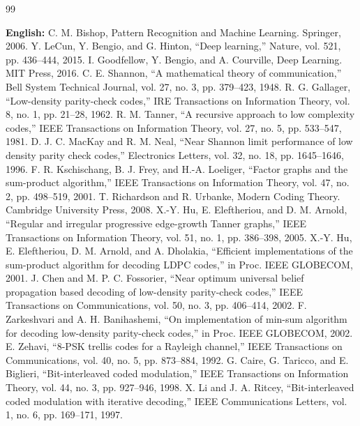\begin{thebibliography}{99}
\item[]\textbf{English:}
 C. M. Bishop, Pattern Recognition and Machine Learning. Springer, 2006.
 Y. LeCun, Y. Bengio, and G. Hinton, ``Deep learning,'' Nature, vol. 521, pp. 436--444, 2015.
 I. Goodfellow, Y. Bengio, and A. Courville, Deep Learning. MIT Press, 2016.
 C. E. Shannon, ``A mathematical theory of communication,'' Bell System Technical Journal, vol. 27, no. 3, pp. 379--423, 1948.
 R. G. Gallager, ``Low-density parity-check codes,'' IRE Transactions on Information Theory, vol. 8, no. 1, pp. 21--28, 1962.
 R. M. Tanner, ``A recursive approach to low complexity codes,'' IEEE Transactions on Information Theory, vol. 27, no. 5, pp. 533--547, 1981.
 D. J. C. MacKay and R. M. Neal, ``Near Shannon limit performance of low density parity check codes,'' Electronics Letters, vol. 32, no. 18, pp. 1645--1646, 1996.
 F. R. Kschischang, B. J. Frey, and H.-A. Loeliger, ``Factor graphs and the sum-product algorithm,'' IEEE Transactions on Information Theory, vol. 47, no. 2, pp. 498--519, 2001.
 T. Richardson and R. Urbanke, Modern Coding Theory. Cambridge University Press, 2008.
 X.-Y. Hu, E. Eleftheriou, and D. M. Arnold, ``Regular and irregular progressive edge-growth Tanner graphs,'' IEEE Transactions on Information Theory, vol. 51, no. 1, pp. 386--398, 2005.
 X.-Y. Hu, E. Eleftheriou, D. M. Arnold, and A. Dholakia, ``Efficient implementations of the sum-product algorithm for decoding LDPC codes,'' in Proc. IEEE GLOBECOM, 2001.
 J. Chen and M. P. C. Fossorier, ``Near optimum universal belief propagation based decoding of low-density parity-check codes,'' IEEE Transactions on Communications, vol. 50, no. 3, pp. 406--414, 2002.
 F. Zarkeshvari and A. H. Banihashemi, ``On implementation of min-sum algorithm for decoding low-density parity-check codes,'' in Proc. IEEE GLOBECOM, 2002.
 E. Zehavi, ``8-PSK trellis codes for a Rayleigh channel,'' IEEE Transactions on Communications, vol. 40, no. 5, pp. 873--884, 1992.
 G. Caire, G. Taricco, and E. Biglieri, ``Bit-interleaved coded modulation,'' IEEE Transactions on Information Theory, vol. 44, no. 3, pp. 927--946, 1998.
 X. Li and J. A. Ritcey, ``Bit-interleaved coded modulation with iterative decoding,'' IEEE Communications Letters, vol. 1, no. 6, pp. 169--171, 1997.

\end{thebibliography}
